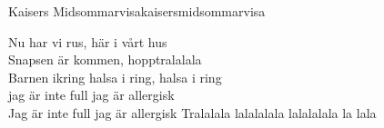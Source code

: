 \begin{song}{Kaisers Midsommarvisa}{kaisersmidsommarvisa}
\begin{vers}
Nu har vi rus, här i vårt hus\\
Snapsen är kommen, hopptralalala\\
Barnen ikring halsa i ring, halsa i ring\\
\repopen jag är inte full jag är allergisk\\
Jag är inte full jag är allergisk
Tralalala lalalalala lalalalala la lala \repclose\\
\end{vers}
\end{song}

